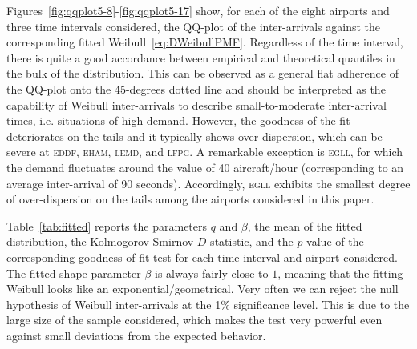 \documentclass[draft,review]{elsarticle}
\makeatletter
\newcommand*{\ie}{i.e.\@\xspace}
\newcommand{\airp}[1]{\textcolor{#1}{\textsc{#1}}}
\makeatother
\begin{document}
Figures~\ref{fig:qqplot5-8}-\ref{fig:qqplot5-17} show, for each of the eight airports and three time intervals considered, the QQ-plot of the inter-arrivals against the corresponding fitted Weibull~\eqref{eq:DWeibullPMF}.
Regardless of the time interval, there is quite a good accordance between empirical and theoretical quantiles in the bulk of the distribution.
This can be observed as a general flat adherence of the QQ-plot onto the 45-degrees dotted line and should be interpreted as the capability of Weibull inter-arrivals to describe small-to-moderate inter-arrival times, \ie{} situations of high demand.
However, the goodness of the fit deteriorates on the tails and it typically shows over-dispersion, which can be severe at \airp{eddf}, \airp{eham}, \airp{lemd}, and \airp{lfpg}.
A remarkable exception is \airp{egll}, for which the demand fluctuates around the value of 40 aircraft/hour (corresponding to an average inter-arrival of 90 seconds).
Accordingly, \airp{egll} exhibits the smallest degree of over-dispersion on the tails among the airports considered in this paper.

Table~\ref{tab:fitted} reports the parameters \(q\) and \(\beta\), the mean of the fitted distribution, the Kolmogorov-Smirnov \(D\)-statistic, and the \(p\)-value of the corresponding goodness-of-fit test for each time interval and airport considered.
The fitted shape-parameter \(\beta\) is always fairly close to \(1\), meaning that the fitting Weibull looks like an exponential/geometrical.
Very often we can reject the null hypothesis of Weibull inter-arrivals at the 1\% significance level.
This is due to the large size of the sample considered, which makes the test very powerful even against small deviations from the expected behavior.
\end{document}
